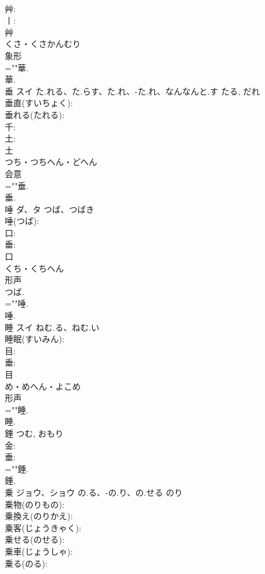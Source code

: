 \documentclass[8pt]{extreport}
\begin{document}
\begin{CJK}{UTF8}{min}
\\	艸: 
\\	丨: 
\\	艸	
\\	くさ・くさかんむり	
\\	象形 
\\	=""華.
\\	華.
\\	垂	スイ	た.れる、た.らす、た.れ、-た.れ、なんなんと.す	たる, だれ	
\\	垂直(すいちょく): 
\\	垂れる(たれる): 
\\	千: 
\\	土: 
\\	土	
\\	つち・つちへん・どへん	
\\	会意 
\\	=""垂.
\\	垂.
\\	唾	ダ、タ	つば、つばき		
\\	唾(つば): 
\\	口: 
\\	垂: 
\\	口	
\\	くち・くちへん	
\\	形声 
\\	つば.	
\\	=""唾.
\\	唾.
\\	睡	スイ	ねむ.る、ねむ.い		
\\	睡眠(すいみん): 
\\	目: 
\\	垂: 
\\	目	
\\	め・めへん・よこめ	
\\	形声 
\\	=""睡.
\\	睡.
\\	錘		つむ, おもり				
\\	金: 
\\	垂: 
\\	=""錘.
\\	錘.
\\	乗	ジョウ、ショウ	の.る、-の.り、の.せる	のり	
\\	乗物(のりもの): 
\\	乗換え(のりかえ): 
\\	乗客(じょうきゃく): 
\\	乗せる(のせる): 
\\	乗車(じょうしゃ): 
\\	乗る(のる): 

\end{CJK}
\end{document}
